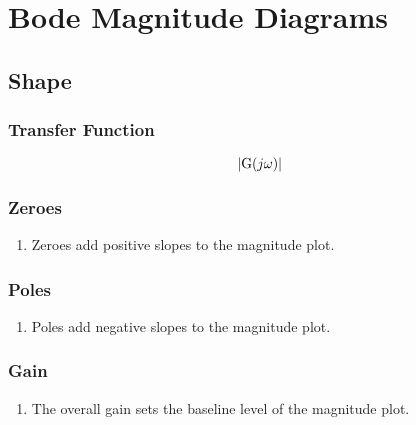\section*{Bode Magnitude Diagrams}
\subsection*{Shape}
\subsubsection*{Transfer Function}
\[
    \left| \func{G}[j\omega] \right|
\]

\subsubsection*{Zeroes}
\begin{enumerate}
    \item Zeroes add positive slopes to the magnitude plot.
\end{enumerate}

\subsubsection*{Poles}
\begin{enumerate}
    \item Poles add negative slopes to the magnitude plot.
\end{enumerate}

\subsubsection*{Gain}
\begin{enumerate}
    \item The overall gain sets the baseline level of the magnitude plot.
\end{enumerate}